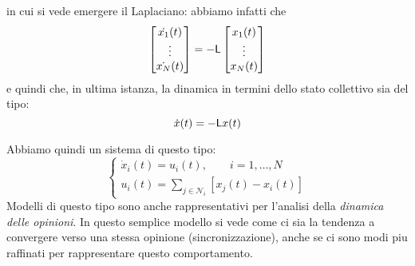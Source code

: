in cui si vede emergere il Laplaciano: abbiamo infatti che
\begin{equation}
\begin{bmatrix}
\dot{x_1}(t) \\
\vdots \\
\dot{x_N}(t)
\end{bmatrix} = - \mathsf{L} \begin{bmatrix}
x_1(t) \\
\vdots \\
x_N(t)
\end{bmatrix}
\end{equation}
e quindi che, in ultima istanza, la dinamica in termini dello stato collettivo sia del tipo:
\begin{equation}
\dot{x}(t) = -\mathsf{L} x(t)
\end{equation}

Abbiamo quindi un sistema di questo tipo:
\begin{equation}
\begin{cases}
\dot{x}_i(t) = u_i(t), \qquad i=1, \dots, N \\
u_i(t) = \sum_{j \in \mathcal{N}_i} [x_j(t) - x_i(t)]
\end{cases}
\end{equation}
Modelli di questo tipo sono anche rappresentativi per l'analisi della \textit{dinamica delle opinioni}. In questo semplice modello si vede come ci sia la tendenza a convergere verso una stessa opinione (sincronizzazione), anche se ci sono modi piu raffinati per rappresentare questo comportamento.

